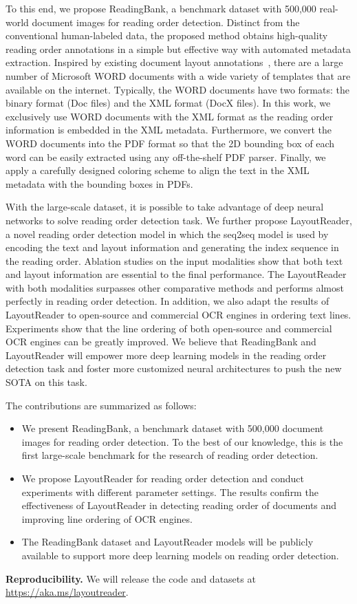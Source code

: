 To this end, we propose ReadingBank, a benchmark dataset with 500,000 real-world document images for reading order detection. 
Distinct from the conventional human-labeled data, the proposed method obtains high-quality reading order annotations in a simple but effective way with automated metadata extraction. 
Inspired by existing document layout annotations~\cite{Siegel2018ExtractingSF, Zhong2019PubLayNetLD, li2020tablebank, li2020docbank}, there are a large number of Microsoft WORD documents with a wide variety of templates that are available on the internet. 
Typically, the WORD documents have two formats: the binary format (Doc files) and the XML format (DocX files). 
In this work, we exclusively use WORD documents with the XML format
as the reading order information is embedded in the XML metadata.
Furthermore, we convert the WORD documents into the PDF format so that the 2D bounding box of each word can be easily extracted using any off-the-shelf PDF parser. 
Finally, we apply a carefully designed coloring scheme to align the text in the XML metadata with the bounding boxes in PDFs. 


With the large-scale dataset, it is possible to take advantage of deep neural networks to solve reading order detection task. 
We further propose LayoutReader, a novel reading order detection model in which the seq2seq model is used by encoding the text and layout information and generating the index sequence in the reading order. Ablation studies on the input modalities show that both text and layout information are essential to the final performance. The LayoutReader with both modalities surpasses other comparative methods and performs almost perfectly in reading order detection.
In addition, we also adapt the results of LayoutReader to open-source and commercial OCR engines in ordering text lines. 
Experiments show that the line ordering of both open-source and commercial OCR engines can be greatly improved. 
We believe that ReadingBank and LayoutReader will empower more deep learning models in the reading order detection task and foster more customized neural architectures to push the new SOTA on this task.

The contributions are summarized as follows:

\begin{itemize}[nosep, leftmargin=*]
    \item We present ReadingBank, a benchmark dataset with 500,000 document images for reading order detection. To the best of our knowledge, this is the first large-scale benchmark for the research of reading order detection.
    \item We propose LayoutReader for reading order detection and conduct experiments with different parameter settings. The results confirm the effectiveness of LayoutReader in detecting reading order of documents and improving line ordering of OCR engines.
    \item The ReadingBank dataset and LayoutReader models will be publicly available to support more deep learning models on reading order detection.
\end{itemize}

\noindent\textbf{Reproducibility.} We will release the code and datasets at \url{https://aka.ms/layoutreader}.